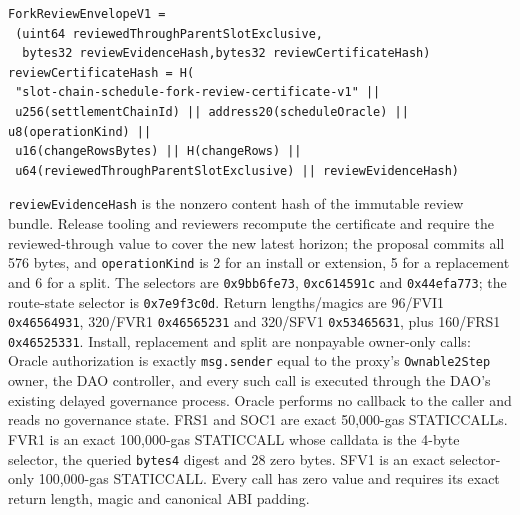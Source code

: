 \documentclass[a4paper,11pt]{article}
\newcommand{\code}[1]{\nolinkurl{#1}}
\begin{document}
\begin{verbatim}
ForkReviewEnvelopeV1 =
 (uint64 reviewedThroughParentSlotExclusive,
  bytes32 reviewEvidenceHash,bytes32 reviewCertificateHash)
reviewCertificateHash = H(
 "slot-chain-schedule-fork-review-certificate-v1" ||
 u256(settlementChainId) || address20(scheduleOracle) || u8(operationKind) ||
 u16(changeRowsBytes) || H(changeRows) ||
 u64(reviewedThroughParentSlotExclusive) || reviewEvidenceHash)
\end{verbatim}
\code{reviewEvidenceHash} is the nonzero content hash of the immutable review
bundle.  Release tooling and reviewers recompute the certificate and require
the reviewed-through value to cover the new latest horizon; the proposal
commits all 576 bytes, and \code{operationKind} is 2 for an install or
extension, 5 for a replacement and 6 for a split.
The selectors are \code{0x9bb6fe73}, \code{0xc614591c} and
\code{0x44efa773}; the route-state selector is \code{0x7e9f3c0d}.
Return lengths/magics are 96/FVI1
\code{0x46564931}, 320/FVR1 \code{0x46565231} and 320/SFV1
\code{0x53465631}, plus 160/FRS1 \code{0x46525331}.  Install, replacement and
split are nonpayable owner-only calls: Oracle authorization is exactly
\code{msg.sender} equal to the proxy's \code{Ownable2Step} owner, the DAO
controller, and every such call is executed through the DAO's existing delayed
governance process.  Oracle performs no callback to the caller and reads no
governance state.  FRS1 and SOC1 are exact 50,000-gas STATICCALLs.  FVR1 is an exact
100,000-gas STATICCALL whose calldata is the 4-byte selector, the queried
\code{bytes4} digest and 28 zero bytes.  SFV1 is an exact selector-only
100,000-gas STATICCALL.  Every call has zero value and requires its exact return
length, magic and canonical ABI padding.
\end{document}
